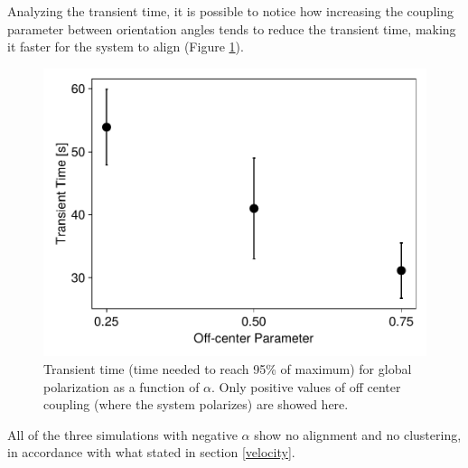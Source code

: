 \documentclass[../../master_thesis_np.tex]{subfiles}
\begin{document}
		Analyzing the transient time, it is possible to notice how increasing the coupling parameter between orientation angles tends to reduce the transient time, making it faster for the system to align (Figure \ref{fig:transienttime_oc}).
		\begin{figure}[htp]
			\centering
			\includegraphics[width = \singfigwidth]{lj_oc/transient_time_alpha.pdf}
			
			\caption{Transient time (time needed to reach 95\% of maximum) for global polarization as a function of $\alpha$. Only positive values of off center coupling (where the system polarizes) are showed here.}
			\label{fig:transienttime_oc}
		\end{figure}
		
		All of the three simulations with negative $\alpha$ show no alignment and no clustering, in accordance with what stated in section \ref{velocity}.
		
\end{document}
